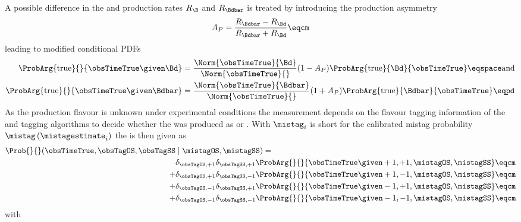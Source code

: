 %
A possible difference in the \Bd and \Bdbar production rates $R_{\B}$ and
$R_{\Bdbar}$ is treated by introducing the production asymmetry
%
\begin{equation}\label{eq:measurement_of_sin2beta:likelihood_fit:model:decay_time:production_asymmetry}
  A_P = \frac{R_{\Bdbar} - R_{\Bd}}{R_{\Bdbar} + R_{\Bd}}\eqcm
\end{equation}
%
leading to modified conditional \acp{PDF}
%
\begin{equation}\label{eq:measurement_of_sin2beta:likelihood_fit:model:decay_time:true_pdf}
  \begin{split}
    \ProbArg{\text{true}}{}{\obsTimeTrue\given\Bd}    &= \frac{\Norm{\obsTimeTrue}{\Bd}}{\Norm{\obsTimeTrue}{}}    (1 - A_P) \ProbArg{\text{true}}{\Bd}{\obsTimeTrue}     \eqspace \text{and} \\
    \ProbArg{\text{true}}{}{\obsTimeTrue\given\Bdbar} &= \frac{\Norm{\obsTimeTrue}{\Bdbar}}{\Norm{\obsTimeTrue}{}} (1 + A_P) \ProbArg{\text{true}}{\Bdbar}{\obsTimeTrue}  \eqpd
  \end{split}
\end{equation}
%
As the production flavour is unknown under experimental conditions the
measurement depends on the flavour tagging information of the \OS and \SSpi
tagging algorithms to decide whether the \Bmeson was produced as \Bd or \Bdbar.
With $\mistag_{i}$ is short for the calibrated mistag probability
$\mistag\left(\mistagestimate_{i}\right)$ the \PDF is then given as
%
\begin{equation}\label{eq:measurement_of_sin2beta:likelihood_fit:model:decay_time:measured_pdf_tagged_only}
\begin{split}
  \Prob{}{}(\obsTimeTrue, \obsTagOS, \obsTagSS &\mid \mistagOS, \mistagSS) = \\
        &\delta_{\obsTagOS,+1}\delta_{\obsTagSS,+1} \ProbArg{}{}{\obsTimeTrue \given +1, +1, \mistagOS, \mistagSS} \eqcm \\
      + &\delta_{\obsTagOS,+1}\delta_{\obsTagSS,-1} \ProbArg{}{}{\obsTimeTrue \given +1, -1, \mistagOS, \mistagSS} \eqcm \\
      + &\delta_{\obsTagOS,-1}\delta_{\obsTagSS,+1} \ProbArg{}{}{\obsTimeTrue \given -1, +1, \mistagOS, \mistagSS} \eqcm \\
      + &\delta_{\obsTagOS,-1}\delta_{\obsTagSS,-1} \ProbArg{}{}{\obsTimeTrue \given -1, -1, \mistagOS, \mistagSS} \eqcm 
  \end{split}
\end{equation}
%
with
%
